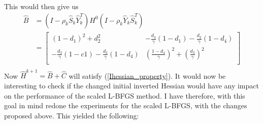 \documentclass[11pt,a4paper]{article}
\begin{document}
This would then give us 
\begin{align*}
\hat{B} &= (I-\rho_k\hat{S}_k\hat{Y}_k^T)H^0(I-\rho_k\hat{Y}_k\hat{S}_k^T)  \\
&=\left[ \begin{array}{cc}
   	(1-d_1)^2 + d_2^2& -\frac{d_3}{\gamma}(1-d_1) -\frac{d_2}{\gamma}(1-d_4)\\
    	-\frac{d_3}{\gamma}(1-c1)-\frac{d_2}{\gamma}(1-d_4)& (\frac{1-d_4}{\gamma})^2 +(\frac{d_3}{\gamma})^2\\
   \end{array}  \right] \\
\end{align*}
Now $\hat{H}^{k+1}=\hat{B}+\hat{C}$ will satisfy (\ref{Ihessian_property}). It would now be interesting to check if the changed initial inverted Hessian would have any impact on the performance of the scaled L-BFGS method. I have therefore, with this goal in mind redone the experiments for the scaled L-BFGS, with the changes proposed above. This yielded the following:
\end{document}
